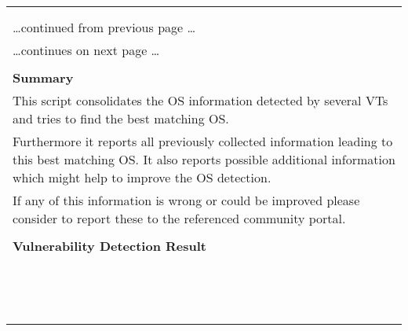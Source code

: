 \documentclass{article}
\begin{document}
\begin{longtable}{|p{}|}
\hline
\rowcolor{gvm_log}{\color{white}{Log (CVSS: 0.0) }}\\
\rowcolor{gvm_log}{\color{white}{NVT: OS Detection Consolidation and Reporting}}\\
\hline
\endfirsthead
\hfill\ldots continued from previous page \ldots \\
\hline
\endhead
\hline
\ldots continues on next page \ldots \\
\endfoot
\hline
\endlastfoot
\\
\textbf{Summary}\\
This script consolidates the OS information detected by several
  VTs and tries to find the best matching OS.\\
  Furthermore it reports all previously collected information leading to this best matching OS. It
  also reports possible additional information which might help to improve the OS detection.\\
  If any of this information is wrong or could be improved please consider to report these to the
  referenced community portal.\\

        \hline
        \\
\textbf{Vulnerability Detection Result}\\
\rowcolor{white}{\verb=Best matching OS:=}\\
\rowcolor{white}{\verb=OS:           Linux/Unix=}\\
\rowcolor{white}{\verb=CPE:          cpe:/o:linux:kernel=}\\
\rowcolor{white}{\verb=Found by NVT: 1.3.6.1.4.1.25623.1.0.102011 (SMB NativeLanMan)=}\\
\rowcolor{white}{\verb=Concluded from SMB/Samba banner on port 445/tcp: =}\\
\rowcolor{white}{\verb=OS String:  Windows 6.1=}\\
\rowcolor{white}{\verb=SMB String: Samba 4.6.2=}\\
\rowcolor{white}{\verb=Note: The service is running on a Linux/Unix based OS but reporting itself with =}\\
\rowcolor{white}{$\hookrightarrow$\verb=an Windows related OS string.=}\\
\rowcolor{white}{\verb=Setting key "Host/runs_unixoide" based on this information=}\\
\rowcolor{white}{\verb=Other OS detections (in order of reliability):=}\\
\rowcolor{white}{\verb=OS:           Linux/Unix=}\\
\rowcolor{white}{\verb=CPE:          cpe:/o:linux:kernel=}\\
\rowcolor{white}{\verb=Found by NVT: 1.3.6.1.4.1.25623.1.0.112869 (Dropbear Detection Consolidation)=}\\


\end{longtable}
\end{document}
